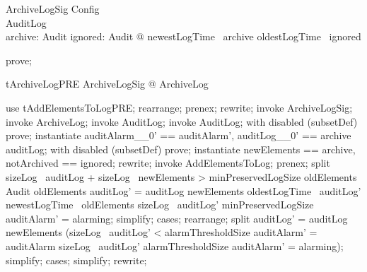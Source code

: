 \begin{schema}{ArchiveLogSig}
  Config\\
  AuditLog\\
  archive: \finset  Audit
\where
  \exists  ignored: \finset  Audit @ newestLogTime~ archive \leq  oldestLogTime~ ignored
\end{schema}

\begin{zproof}
prove;
\end{zproof}

\begin{theorem}{tArchiveLogPRE}
\forall  ArchiveLogSig @ \pre  ArchiveLog
\end{theorem}

\begin{zproof}[tArchiveLogPRE]
use tAddElementsToLogPRE;
rearrange;
prenex;
rewrite;
invoke ArchiveLogSig;
invoke ArchiveLog;
invoke \Delta AuditLog;
invoke AuditLog;
with disabled (subsetDef) prove;
instantiate auditAlarm\_\_0' == auditAlarm', auditLog\_\_0' == archive \cup  auditLog;
with disabled (subsetDef) prove;
instantiate newElements == archive, notArchived == ignored;
rewrite;
invoke AddElementsToLog;
prenex;
split sizeLog~ auditLog + sizeLog~ newElements > minPreservedLogSize \land  oldElements \in  \finset  Audit \land  oldElements \cup  auditLog' = auditLog \cup  newElements \land  oldestLogTime~ auditLog' \geq  newestLogTime~ oldElements \land  sizeLog~ auditLog' \geq  minPreservedLogSize \land  auditAlarm' = alarming;
simplify;
cases;
rearrange;
split auditLog' = auditLog \cup  newElements \land  (sizeLog~ auditLog' < alarmThresholdSize \land  auditAlarm' = auditAlarm \lor  sizeLog~ auditLog' \geq  alarmThresholdSize \land  auditAlarm' = alarming);
simplify;
cases;
simplify;
rewrite;
\end{zproof}


